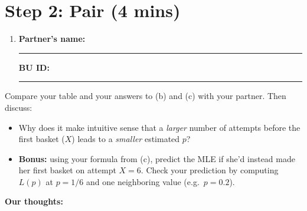 \documentclass{article}
\newcommand{\nameblank}{\rule{1.75in}{0.4pt}}
\newcommand{\idblank}{\rule{1.55in}{0.4pt}}
\begin{document}
\section*{Step 2: Pair (4 mins)}

\begin{enumerate}[label=\arabic*.,leftmargin=*,itemsep=.7em, start=2]
  \item \textbf{Partner's name:} \nameblank \hfill \textbf{BU ID:} \idblank
\end{enumerate}

Compare your table and your answers to (b) and (c) with your partner. Then discuss:

\begin{itemize}
  \item Why does it make intuitive sense that a \emph{larger} number of attempts before the first basket ($X$) leads to a \emph{smaller} estimated $p$?
  \item \textbf{Bonus:} using your formula from (c), predict the MLE if she'd instead made her first basket on attempt $X=6$. Check your prediction by computing $L(p)$ at $p=1/6$ and one neighboring value (e.g.\ $p=0.2$).
\end{itemize}

\textbf{Our thoughts:}
\vfill
\end{document}

